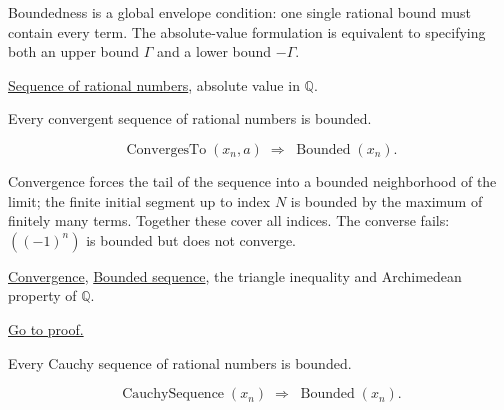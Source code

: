 \begin{remark*}[Interpretation]
Boundedness is a global envelope condition: one single rational bound must
contain every term.  The absolute-value formulation is equivalent to
specifying both an upper bound $\Gamma$ and a lower bound $-\Gamma$.
\end{remark*}

\begin{remark*}[Dependencies]
\hyperref[def:rational-sequence]{Sequence of rational numbers},
absolute value in $\mathbb{Q}$.
\end{remark*}

\begin{theorem}
\label{thm:convergent-bounded-q}
Every convergent sequence of rational numbers is bounded.
\end{theorem}

\begin{remark*}
\[
\operatorname{ConvergesTo}(x_n, a)
\;\Longrightarrow\;
\operatorname{Bounded}(x_n).
\]
\end{remark*}

\begin{remark*}[Interpretation]
Convergence forces the tail of the sequence into a bounded neighborhood of
the limit; the finite initial segment up to index $N$ is bounded by the
maximum of finitely many terms.  Together these cover all indices.
The converse fails: $((-1)^n)$ is bounded but does not converge.
\end{remark*}

\begin{remark*}[Dependencies]
\hyperref[def:convergent-rational-sequence]{Convergence},
\hyperref[def:bounded-sequence-q]{Bounded sequence},
the triangle inequality and Archimedean property of $\mathbb{Q}$.
\end{remark*}

\begin{remark*}[Proof]
\hyperref[prf:convergent-bounded-q]{Go to proof.}
\end{remark*}

\begin{theorem}
\label{thm:cauchy-bounded-q}
Every Cauchy sequence of rational numbers is bounded.
\end{theorem}

\begin{remark*}
\[
\operatorname{CauchySequence}(x_n)
\;\Longrightarrow\;
\operatorname{Bounded}(x_n).
\]
\end{remark*}

